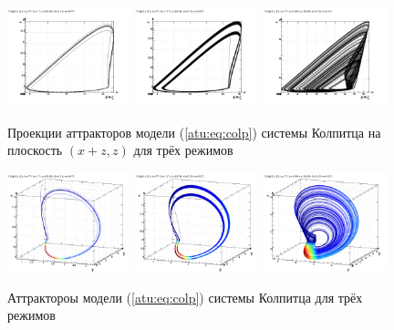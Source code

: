 \begin{figure}[htb!]
 \centerline{
   \includegraphics[width=0.32\textwidth]{p/cha/colp/colp_0-p_z_xpz_b=1x70.png}
   \includegraphics[width=0.32\textwidth]{p/cha/colp/colp_0-p_z_xpz_b=1x37.png}
   \includegraphics[width=0.32\textwidth]{p/cha/colp/colp_0-p_z_xpz_b=0x99.png}
 }
  \caption{Проекции аттракторов модели (\ref{atu:eq:colp}) системы Колпитца на плоскость $(x+z,z)$
  для трёх режимов}
  \label{atu:f:colp_model_xzz}
\end{figure}


\begin{figure}[htb!]
 \centerline{
   \includegraphics[width=0.32\textwidth]{p/cha/colp/colp_0-p_xyz_b=1x70.png}
   \includegraphics[width=0.32\textwidth]{p/cha/colp/colp_0-p_xyz_b=1x37.png}
   \includegraphics[width=0.32\textwidth]{p/cha/colp/colp_0-p_xyz_b=0x99.png}
 }
  \caption{Аттрактороы модели (\ref{atu:eq:colp}) системы Колпитца для трёх режимов}
  \label{atu:f:colp_model_xyz}
\end{figure}

